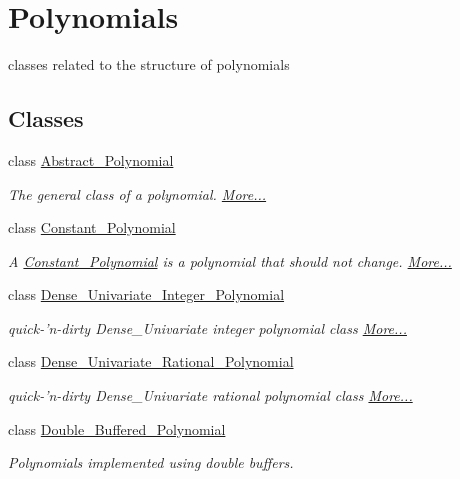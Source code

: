 \hypertarget{group__polygroup}{}\section{Polynomials}
\label{group__polygroup}


classes related to the structure of polynomials  


\subsection*{Classes}
\begin{DoxyCompactItemize}
\item 
class \hyperlink{group__polygroup_class_abstract___polynomial}{Abstract\+\_\+\+Polynomial}
\begin{DoxyCompactList}\small\item\em The general class of a polynomial.  \hyperlink{group__polygroup_class_abstract___polynomial}{More...}\end{DoxyCompactList}\item 
class \hyperlink{group__polygroup_class_constant___polynomial}{Constant\+\_\+\+Polynomial}
\begin{DoxyCompactList}\small\item\em A \hyperlink{group__polygroup_class_constant___polynomial}{Constant\+\_\+\+Polynomial} is a polynomial that should not change.  \hyperlink{group__polygroup_class_constant___polynomial}{More...}\end{DoxyCompactList}\item 
class \hyperlink{group__polygroup_class_dense___univariate___integer___polynomial}{Dense\+\_\+\+Univariate\+\_\+\+Integer\+\_\+\+Polynomial}
\begin{DoxyCompactList}\small\item\em quick-\/'n-\/dirty Dense\+\_\+\+Univariate integer polynomial class  \hyperlink{group__polygroup_class_dense___univariate___integer___polynomial}{More...}\end{DoxyCompactList}\item 
class \hyperlink{group__polygroup_class_dense___univariate___rational___polynomial}{Dense\+\_\+\+Univariate\+\_\+\+Rational\+\_\+\+Polynomial}
\begin{DoxyCompactList}\small\item\em quick-\/'n-\/dirty Dense\+\_\+\+Univariate rational polynomial class  \hyperlink{group__polygroup_class_dense___univariate___rational___polynomial}{More...}\end{DoxyCompactList}\item 
class \hyperlink{group__polygroup_class_double___buffered___polynomial}{Double\+\_\+\+Buffered\+\_\+\+Polynomial}
\begin{DoxyCompactList}\small\item\em Polynomials implemented using double buffers.


\end{DoxyCompactList}
\end{DoxyCompactItemize}
